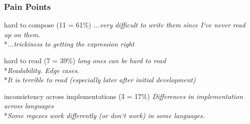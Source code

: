 \begin{frame}
\frametitle{Pain Points}
\begin{block}{hard to compose (11 = 61\%)}
\emph{...very difficult to write them since I`ve never read up on them.}
\\*\emph{...trickiness to getting the expression right}
\end{block}
\begin{block}{hard to read (7 = 39\%)}
\emph{long ones can be hard to read}
\\*\emph{Readability. Edge cases.}
\\*\emph{It is terrible to read (especially later after initial development) }
\end{block}
\begin{block}{inconsistency across implementations (3 = 17\%)}
\emph{Differences in implementation across languages}
\\*\emph{Some regexes work differently (or don`t work) in some languages.}
\end{block}
\end{frame}












